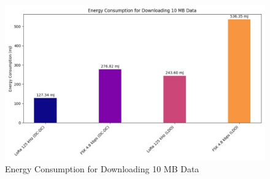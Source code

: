 \begin{figure}[h!]
    \centering
    \includegraphics[width=0.6\columnwidth]{figures/loraRx.pdf}
    \caption{Energy Consumption for Downloading 10 MB Data}
    \label{fig:loraRx}
\end{figure}
